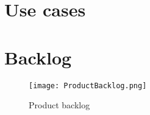 \section{Use cases}



\section{Backlog}

\begin{figure} \label{fml}
    \caption{Product backlog}
    \centering
        \texttt{[image: ProductBacklog.png]}
\end{figure}

